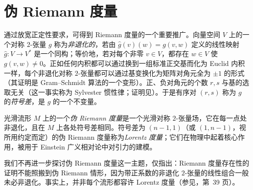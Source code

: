 \documentclass[../../main.tex]{subfiles}
\begin{document}
\section{伪 Riemann 度量}\label{section:ch13-pseudo-riemannian}

通过放宽正定性要求，可得到 Riemann 度量的一个重要推广。向量空间 $V$ 上的一个对称 $2$-张量 $g$ 称为\emph{非退化的}，若由 $\hat g(v)(w)=g(v,w)$ 定义的线性映射 $\hat g:V\to V^*$ 是一个同构；等价地，若对每个非零 $v\in V$，都存在 $w\in V$ 使 $g(v,w)\ne0$。正如任何内积都可以通过换到一组标准正交基而化为 Euclid 内积一样，每个非退化对称 $2$-张量都可以通过基变换化为矩阵对角元全为 $\pm1$ 的形式（其证明是 Gram--Schmidt 算法的一个变形）。正、负对角元的个数 $r,s$ 与基的选取无关（这一事实称为 Sylvester 惯性律；证明见\cite{FIS03}）。于是有序对 $(r,s)$ 称为 $g$ 的\emph{符号差}，是 $g$ 的一个不变量。

光滑流形 $M$ 上的一个\emph{伪 Riemann 度量}是一个光滑对称 $2$-张量场，它在每一点处非退化，且在 $M$ 上各处符号差相同。符号差为 $(n-1,1)$（或 $(1,n-1)$，视所用约定而定）的伪 Riemann 度量称为\emph{Lorentz 度量}；它们在物理中起着核心作用，被用于 Einstein 广义相对论中对引力的建模。

我们不再进一步探讨伪 Riemann 度量这一主题，仅指出：Riemann 度量存在性的证明不能照搬到伪 Riemann 情形，因为带正系数的非退化 $2$-张量的线性组合一般未必非退化。事实上，并非每个流形都容许 Lorentz 度量（参见\cite{HE73}，第~39 页）。
\end{document}
